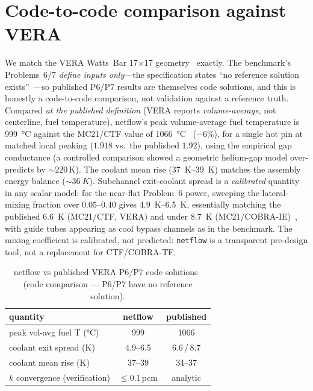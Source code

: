 \documentclass[10pt,twocolumn]{article}
\begin{document}
\section{Code-to-code comparison against VERA}
We match the VERA Watts~Bar 17$\times$17 geometry~\cite{vera} exactly.
The benchmark's Problems~6/7 \emph{define inputs only}---the
specification states ``no reference solution exists''~\cite{vera}---so
published P6/P7 results are themselves code solutions, and this is
honestly a code-to-code comparison, not validation against a reference
truth. Compared \emph{at the published definition} (VERA reports
\emph{volume-average}, not centerline, fuel temperature), netflow's peak
volume-average fuel temperature is \SI{999}{\celsius} against the
MC21/CTF value of \SI{1066}{\celsius}~\cite{kelly} ($-6\%$), for a single
hot pin at matched local peaking ($1.918$ vs.\ the published $1.92$),
using the empirical gap conductance (a controlled comparison showed a
geometric helium-gap model over-predicts by ${\sim}220$\,K). The coolant
mean rise (\SIrange{37}{39}{K}) matches the assembly energy balance
(${\sim}\SI{36}{K}$). Subchannel exit-coolant spread is a
\emph{calibrated} quantity in any scalar model: for the near-flat
Problem~6 power, sweeping the lateral-mixing fraction over $0.05$--$0.40$
gives \SIrange{4.9}{6.5}{K}, essentially matching the published
\SI{6.6}{K} (MC21/CTF, VERA) and under \SI{8.7}{K}
(MC21/COBRA-IE)~\cite{aviles}, with guide tubes appearing as cool bypass
channels as in the benchmark. The mixing coefficient is calibrated, not
predicted: \texttt{netflow} is a transparent pre-design tool, not a
replacement for CTF/COBRA-TF.

\begin{table}[t]
\centering\small
\caption{netflow vs published VERA P6/P7 code solutions~\cite{kelly,aviles}
(code comparison --- P6/P7 have no reference solution).}
\label{tab:introcompare}
\begin{tabular}{lcc}
\toprule
quantity & netflow & published \\
\midrule
peak vol-avg fuel T (\si{\celsius}) & 999 & 1066 \\
coolant exit spread (\si{K}) & 4.9--6.5 & 6.6\,/\,8.7 \\
coolant mean rise (\si{K}) & 37--39 & 34--37 \\
$k$ convergence (verification) & $\le$0.1\,pcm & analytic \\
\bottomrule
\end{tabular}
\end{table}
\end{document}

